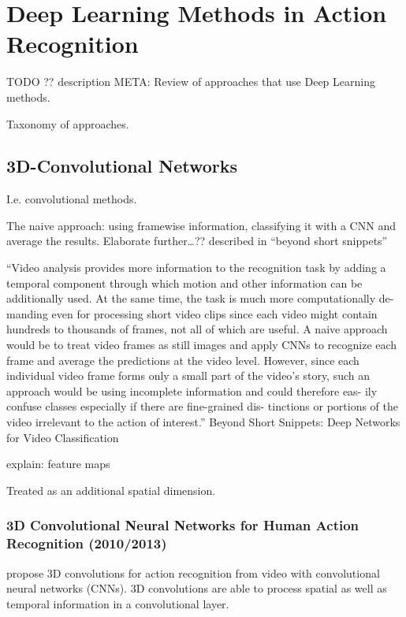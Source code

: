 \section{Deep Learning Methods in Action Recognition}
TODO ?? description
META: Review of approaches that use Deep Learning methods.

Taxonomy of approaches.


\subsection{3D-Convolutional Networks}

I.e. convolutional methods.

The naive approach: using framewise information, classifying it with a CNN and average the results. Elaborate further\ldots ?? described in ``beyond short snippets''


``Video analysis provides more information to the recognition task by adding a temporal component through which motion and other information can be additionally used. At
the same time, the task is much more computationally de-
manding even for processing short video clips since each
video might contain hundreds to thousands of frames, not
all of which are useful. A naive approach would be to treat
video frames as still images and apply CNNs to recognize
each frame and average the predictions at the video level.
However, since each individual video frame forms only a
small part of the video’s story, such an approach would
be using incomplete information and could therefore eas-
ily confuse classes especially if there are fine-grained dis-
tinctions or portions of the video irrelevant to the action of
interest.'' Beyond Short Snippets: Deep Networks for Video Classification

explain: feature maps

Treated as an additional spatial dimension.


\subsubsection{3D Convolutional Neural Networks for Human Action Recognition (2010/2013)}

\textcite{ji_3d_2013} propose 3D convolutions for action recognition from video with convolutional neural networks (CNNs).
3D convolutions are able to process spatial as well as temporal information in a convolutional layer.

